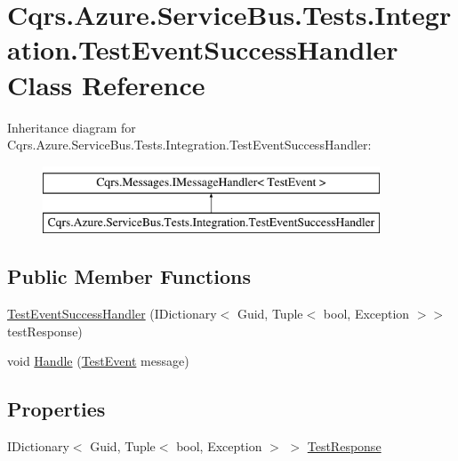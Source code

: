 \hypertarget{classCqrs_1_1Azure_1_1ServiceBus_1_1Tests_1_1Integration_1_1TestEventSuccessHandler}{}\section{Cqrs.\+Azure.\+Service\+Bus.\+Tests.\+Integration.\+Test\+Event\+Success\+Handler Class Reference}
\label{classCqrs_1_1Azure_1_1ServiceBus_1_1Tests_1_1Integration_1_1TestEventSuccessHandler}
Inheritance diagram for Cqrs.\+Azure.\+Service\+Bus.\+Tests.\+Integration.\+Test\+Event\+Success\+Handler\+:\begin{figure}[H]
\begin{center}
\leavevmode
\includegraphics[height=2.000000cm]{classCqrs_1_1Azure_1_1ServiceBus_1_1Tests_1_1Integration_1_1TestEventSuccessHandler}
\end{center}
\end{figure}
\subsection*{Public Member Functions}
\begin{DoxyCompactItemize}
\item 
\hyperlink{classCqrs_1_1Azure_1_1ServiceBus_1_1Tests_1_1Integration_1_1TestEventSuccessHandler_ab39bc54e4c49cf338e3c47627d367c72_ab39bc54e4c49cf338e3c47627d367c72}{Test\+Event\+Success\+Handler} (I\+Dictionary$<$ Guid, Tuple$<$ bool, Exception $>$$>$ test\+Response)
\item 
void \hyperlink{classCqrs_1_1Azure_1_1ServiceBus_1_1Tests_1_1Integration_1_1TestEventSuccessHandler_a6091c03591fd162a96fcba89a40f8d2f_a6091c03591fd162a96fcba89a40f8d2f}{Handle} (\hyperlink{classCqrs_1_1Azure_1_1ServiceBus_1_1Tests_1_1Unit_1_1TestEvent}{Test\+Event} message)
\end{DoxyCompactItemize}
\subsection*{Properties}
\begin{DoxyCompactItemize}
\item 
I\+Dictionary$<$ Guid, Tuple$<$ bool, Exception $>$ $>$ \hyperlink{classCqrs_1_1Azure_1_1ServiceBus_1_1Tests_1_1Integration_1_1TestEventSuccessHandler_a01443ad3c6558530400b8cff76796fca_a01443ad3c6558530400b8cff76796fca}{Test\+Response}
\end{DoxyCompactItemize}



